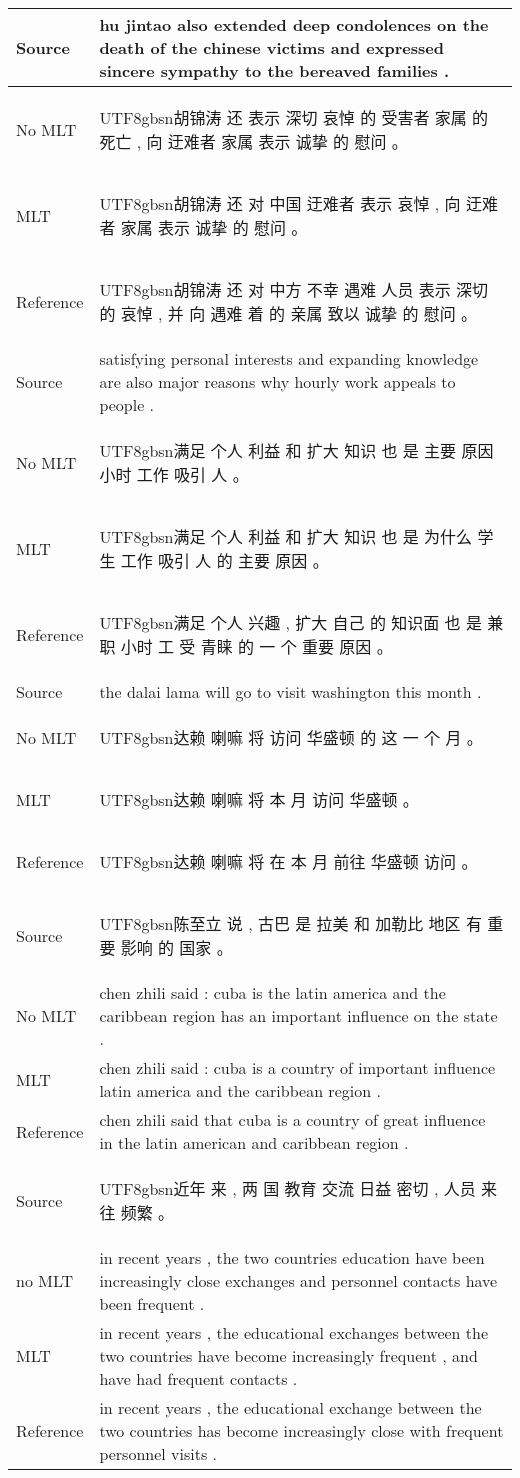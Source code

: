 \documentclass[a4paper]{article}
\newcommand{\cntext}[1]{\begin{CJK}{UTF8}{gbsn}#1\end{CJK}}
\begin{document}
\begin{table*}
\centering
\begin{tabular}{|l|m{}|} \hline
Source & hu jintao also extended deep condolences on the death of the chinese victims and expressed sincere sympathy to the bereaved families .
\\ \hline
No MLT & \cntext{胡锦涛 还 表示 深切 哀悼 的 受害者 家属 的 死亡 , 向 迂难者 家属 表示 诚挚 的 慰问 。} \\ \hline
MLT & \cntext{胡锦涛 还 对 中国 迂难者 表示 哀悼 , 向 迂难者 家属 表示 诚挚 的 慰问 。} \\ \hline 
Reference & \cntext{胡锦涛 还 对 中方 不幸 遇难 人员 表示 深切 的 哀悼 , 并 向 遇难 着 的 亲属 致以 诚挚 的 慰问 。} \\ \hline \hline
Source & satisfying personal interests and expanding knowledge are also major reasons why hourly work appeals to people .\\ \hline
No MLT & \cntext{满足 个人 利益 和 扩大 知识 也 是 主要 原因 小时 工作 吸引 人 。} \\ \hline
MLT & \cntext{满足 个人 利益 和 扩大 知识 也 是 为什么 学生 工作 吸引 人 的 主要 原因 。} \\ \hline 
Reference & \cntext{满足 个人 兴趣 , 扩大 自己 的 知识面 也 是 兼职 小时 工 受 青睐 的 一 个 重要 原因 。} \\ \hline \hline

Source & the dalai lama will go to visit washington this month .\\ \hline
No MLT & \cntext{达赖 喇嘛 将 访问 华盛顿 的 这 一 个 月 。} \\ \hline
MLT & \cntext{达赖 喇嘛 将 本 月 访问 华盛顿 。} \\ \hline
Reference & \cntext{达赖 喇嘛 将 在 本 月 前往 华盛顿 访问 。} \\ \hline \hline
Source & \cntext{陈至立 说 , 古巴 是 拉美 和 加勒比 地区 有 重要 影响 的 国家 。}
\\ \hline
No MLT & chen zhili said : cuba is the latin america and the caribbean region has an important influence on the state .
\\ \hline
MLT & chen zhili said : cuba is a country of important influence latin america and the caribbean region .
\\ \hline
Reference & chen zhili said that cuba is a country of great influence in the latin american and caribbean region .
\\ \hline \hline

Source & \cntext{近年 来 , 两 国 教育 交流 日益 密切 , 人员 来往 频繁 。}
\\ \hline
no MLT & in recent years , the two countries education have been increasingly close exchanges and personnel contacts have been frequent .
\\ \hline
MLT & in recent years , the educational exchanges between the two countries have become increasingly frequent , and have had frequent contacts .
\\ \hline
Reference & in recent years , the educational exchange between the two countries has become increasingly close with frequent personnel visits .
\\ \hline


\end{tabular}
\end{table*}
\end{document}
